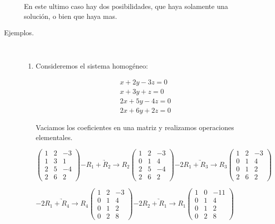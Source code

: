 \documentclass[12pt]{article}
\begin{document}
\begin{description}
En este ultimo caso hay dos posibilidades, que haya solamente una solución, o bien que haya mas.

\item [Ejemplos.] \mbox{}\\

\begin{enumerate}
\item
Consideremos el sistema homogéneo:

\begin{eqnarray}
x + 2 y - 3 z = 0   \nonumber \\
x + 3 y + z = 0     \nonumber \\
2 x + 5 y - 4 z = 0 \nonumber \\
2 x + 6 y + 2 z = 0 \nonumber
\end{eqnarray}

Vaciamos los coeficientes en una matriz y realizamos operaciones elementales.

\begin{math}
\begin{pmatrix}
1 & 2 & -3 \\
1 & 3 & 1  \\
2 & 5 & -4 \\
2 & 6 & 2
\end{pmatrix}
\underrightarrow{-R_1 + R_2 \to R_2}
\begin{pmatrix}
1 & 2 & -3 \\
0 & 1 & 4  \\
2 & 5 & -4 \\
2 & 6 & 2
\end{pmatrix}
\underrightarrow{-2 R_1 + R_3 \to R_3}
\begin{pmatrix}
1 & 2 & -3 \\
0 & 1 & 4  \\
0 & 1 & 2  \\
2 & 6 & 2
\end{pmatrix}
\end{math}

\begin{math}
\underrightarrow{-2 R_1 + R_4 \to R_4}
\begin{pmatrix}
1 & 2 & -3 \\
0 & 1 & 4  \\
0 & 1 & 2  \\
0 & 2 & 8
\end{pmatrix}
\underrightarrow{-2 R_2 + R_1 \to R_1}
\begin{pmatrix}
1 & 0 & -11 \\
0 & 1 & 4   \\
0 & 1 & 2   \\
0 & 2 & 8
\end{pmatrix}
\end{math}


\end{enumerate}
\end{description}
\end{document}

